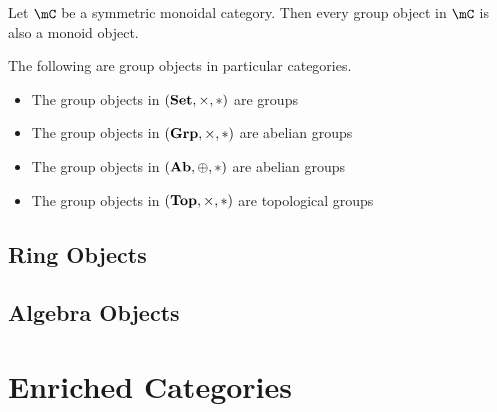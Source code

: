\documentclass[a4paper]{article}
\begin{document}
\begin{lmm}{}{} Let $\mC$ be a symmetric monoidal category. Then every group object in $\mC$ is also a monoid object. 
\end{lmm}

\begin{thm}{}{} The following are group objects in particular categories. 
\begin{itemize}
\item The group objects in $(\bold{Set},\times,\ast)$ are groups
\item The group objects in $(\bold{Grp},\times,\ast)$ are abelian groups
\item The group objects in $(\bold{Ab},\oplus,\ast)$ are abelian groups
\item The group objects in $(\bold{Top},\times,\ast)$ are topological groups
\end{itemize}
\end{thm}

\subsection{Ring Objects}

\subsection{Algebra Objects}

\pagebreak
\section{Enriched Categories}
\end{document}

